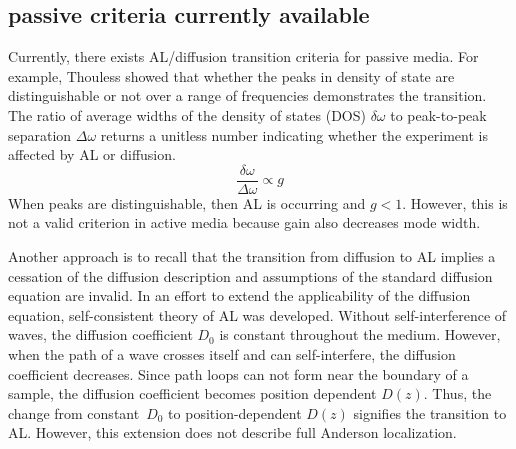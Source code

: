 \subsection{passive criteria currently available}
\label{sec:passive_criteria}
Currently, there exists AL/diffusion transition criteria for passive media. 
For example, Thouless \cite{1977_Thouless} showed that whether the peaks in density of state are distinguishable or not over a range of frequencies demonstrates the transition. The ratio of average widths of the density of states (DOS) $\delta \omega$ to peak-to-peak separation $\Delta \omega$ returns a unitless number indicating whether the experiment is affected by AL or diffusion. 
\begin{equation}
\frac{\delta \omega}{\Delta \omega} \propto g
\label{eq:Thouless_passive}
\end{equation}
When peaks are distinguishable, then AL is occurring and $g<1$. However, this is not a valid criterion in active media because gain also decreases mode width.

Another approach is to recall that the transition from diffusion to AL implies a cessation of the diffusion description and assumptions of the standard diffusion equation are invalid. In an effort to extend the applicability of the diffusion equation, self-consistent theory of AL \cite{1980_Vollhardt_Wolfle}\cite{2008_Cherroret} was developed. Without self-interference of waves, the diffusion coefficient $D_0$ is constant throughout the medium. However, when the path of a wave crosses itself and can self-interfere, the diffusion coefficient decreases.
Since path loops can not form near the boundary of a sample, the diffusion coefficient becomes position dependent $D(z)$. Thus, the change from constant~$D_0$ to position-dependent $D(z)$ signifies the transition to AL. However, this extension does not describe full Anderson localization.

